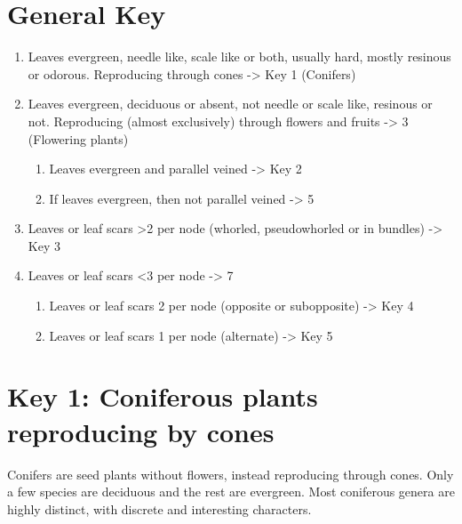 \documentclass[openany]{book}
\providecommand{\tightlist}{%
  \setlength{\itemsep}{0pt}\setlength{\parskip}{0pt}}
\begin{document}
\hypertarget{general-key-2}{%
\section{General Key}\label{general-key-2}}

\begin{enumerate}
\def\labelenumi{\arabic{enumi}.}
\item
  Leaves evergreen, needle like, scale like or both, usually hard,
  mostly resinous or odorous. Reproducing through cones -\textgreater{}
  Key 1 (Conifers)
\item
  Leaves evergreen, deciduous or absent, not needle or scale like,
  resinous or not. Reproducing (almost exclusively) through flowers and
  fruits -\textgreater{} 3 (Flowering plants)

  \begin{enumerate}
  \def\labelenumii{\arabic{enumii}.}
  \setcounter{enumii}{2}
  \tightlist
  \item
    Leaves evergreen and parallel veined -\textgreater{} Key 2
  \item
    If leaves evergreen, then not parallel veined -\textgreater{} 5
  \end{enumerate}
\item
  Leaves or leaf scars \textgreater{}2 per node (whorled, pseudowhorled
  or in bundles) -\textgreater{} Key 3
\item
  Leaves or leaf scars \textless{}3 per node -\textgreater{} 7

  \begin{enumerate}
  \def\labelenumii{\arabic{enumii}.}
  \setcounter{enumii}{6}
  \tightlist
  \item
    Leaves or leaf scars 2 per node (opposite or subopposite)
    -\textgreater{} Key 4
  \item
    Leaves or leaf scars 1 per node (alternate) -\textgreater{} Key 5
  \end{enumerate}
\end{enumerate}

\hypertarget{key-1-coniferous-plants-reproducing-by-cones}{%
\section{Key 1: Coniferous plants reproducing by
cones}\label{key-1-coniferous-plants-reproducing-by-cones}}

Conifers are seed plants without flowers, instead reproducing through
cones. Only a few species are deciduous and the rest are evergreen. Most
coniferous genera are highly distinct, with discrete and interesting
characters.
\end{document}
